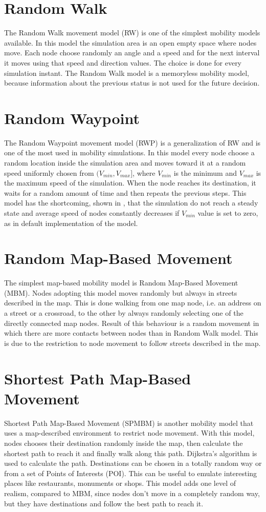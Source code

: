 \section{Random Walk}
The Random Walk movement model (RW) is one of the simplest mobility models available. In this model the simulation area is an open empty space where nodes move. Each node choose randomly an angle and a speed and for the next interval it moves using that speed and direction values. The choice is done for every simulation instant. The Random Walk model is a memoryless mobility model, because information about the previous status is not used for the future decision. 


\section{Random Waypoint}
The Random Waypoint movement model (RWP) is a generalization of RW and is one of the most used in mobility simulations. In this model every node choose a random location inside the simulation area and moves toward it at a random speed uniformly chosen from $(V_{min}, V_{max}]$, where $V_{min}$ is the minimum and $V_{max}$ is the maximum speed of the simulation. When the node reaches its destination, it waits for a random amount of time and then repeats the previous steps. This model has the shortcoming, shown in \cite{RWPHarmful}, that the simulation do not reach a steady state and average speed of nodes constantly decreases if $V_{min}$ value is set to zero, as in default implementation of the model. 


\section{Random Map-Based Movement}
The simplest map-based mobility model is Random Map-Based Movement (MBM). Nodes adopting this model moves randomly but always in streets described in the map. This is done walking from one map node, i.e. an address on a street or a crossroad, to the other by always randomly selecting one of the directly connected map nodes. Result of this behaviour is a random movement in which there are more contacts between nodes than in Random Walk model. This is due to the restriction to node movement to follow streets described in the map.


\section{Shortest Path Map-Based Movement}
Shortest Path Map-Based Movement (SPMBM) is another mobility model that uses a map-described environment to restrict node movement. With this model, nodes chooses their destination randomly inside the map, then calculate the shortest path to reach it and finally walk along this path. Dijkstra's algorithm is used to calculate the path. Destinations can be chosen in a totally random way or from a set of Points of Interests (POI). This can be useful to emulate interesting places like restaurants, monuments or shops. This model adds one level of realism, compared to MBM, since nodes don't move in a completely random way, but they have destinations and follow the best path to reach it.


